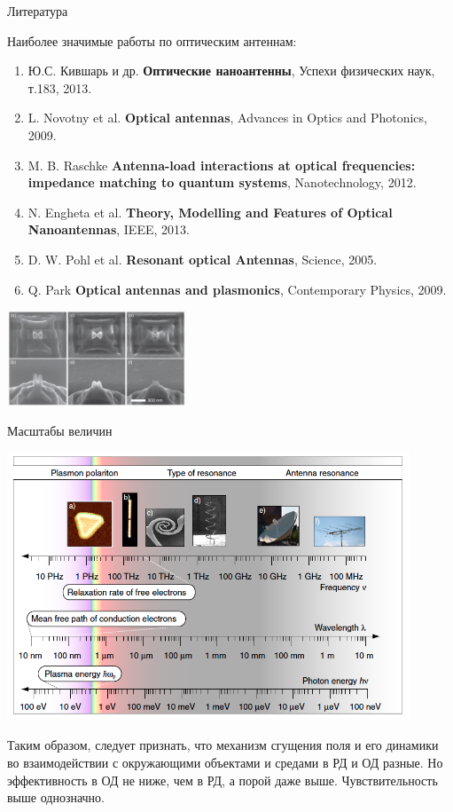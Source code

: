 \documentclass[9pt, compress, xcolor=table]{beamer}
\begin{document}
\begin{frame}{Литература}

Наиболее значимые работы по оптическим антеннам:

\begin{enumerate}

\item Ю.С. Кившарь и др. \textbf{Оптические наноантенны}, Успехи физических наук, т.183, 2013.

\item L. Novotny et al. \textbf{Optical antennas}, Advances in Optics and Photonics, 2009.

\item M. B. Raschke \textbf{Antenna-load interactions at optical frequencies: impedance matching to quantum systems}, Nanotechnology, 2012.

\item N. Engheta et al. \textbf{Theory, Modelling and Features of Optical Nanoantennas}, IEEE, 2013.

\item D. W. Pohl et al. \textbf{Resonant optical Antennas}, Science, 2005.

\item Q. Park \textbf{Optical antennas and plasmonics}, Contemporary Physics, 2009.
\end{enumerate}
\begin{center}
\includegraphics[width=0.4\textwidth]{optant2}
\end{center}
\end{frame}
\begin{frame}{Масштабы величин}
\begin{center}
\includegraphics[width=0.9\textwidth]{optant50}

Таким образом, следует признать, что механизм сгущения поля и его динамики во взаимодействии с окружающими объектами и средами в РД и ОД разные. Но эффективность в ОД не ниже, чем в РД, а порой даже выше. Чувствительность выше однозначно. 
\end{center}

\end{frame}
\end{document}
